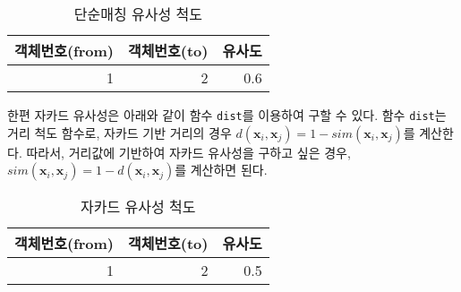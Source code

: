 \documentclass[]{book}
\newenvironment{Shaded}{\begin{snugshade}}{\end{snugshade}}
\newcommand{\DataTypeTok}[1]{\textcolor[rgb]{0.13,0.29,0.53}{#1}}
\newcommand{\DecValTok}[1]{\textcolor[rgb]{0.00,0.00,0.81}{#1}}
\newcommand{\KeywordTok}[1]{\textcolor[rgb]{0.13,0.29,0.53}{\textbf{#1}}}
\newcommand{\NormalTok}[1]{#1}
\newcommand{\OperatorTok}[1]{\textcolor[rgb]{0.81,0.36,0.00}{\textbf{#1}}}
\newcommand{\OtherTok}[1]{\textcolor[rgb]{0.56,0.35,0.01}{#1}}
\newcommand{\StringTok}[1]{\textcolor[rgb]{0.31,0.60,0.02}{#1}}
\begin{document}
\begin{table}[t]

\caption{\label{tab:binary-simplematching}단순매칭 유사성 척도}
\centering
\begin{tabular}{rrr}
\toprule
객체번호(from) & 객체번호(to) & 유사도\\
\midrule
1 & 2 & 0.6\\
\bottomrule
\end{tabular}
\end{table}

한편 자카드 유사성은 아래와 같이 함수 \texttt{dist}를 이용하여 구할 수 있다. 함수 \texttt{dist}는 거리 척도 함수로, 자카드 기반 거리의 경우 \(d(\mathbf{x}_i, \mathbf{x}_j) = 1 - sim(\mathbf{x}_i, \mathbf{x}_j)\)를 계산한다. 따라서, 거리값에 기반하여 자카드 유사성을 구하고 싶은 경우, \(sim(\mathbf{x}_i, \mathbf{x}_j) = 1 - d(\mathbf{x}_i, \mathbf{x}_j)\)를 계산하면 된다.

\begin{Shaded}
\end{Shaded}

\begin{table}[t]

\caption{\label{tab:binary-jaccard}자카드 유사성 척도}
\centering
\begin{tabular}{rrr}
\toprule
객체번호(from) & 객체번호(to) & 유사도\\
\midrule
1 & 2 & 0.5\\
\bottomrule
\end{tabular}
\end{table}
\end{document}
